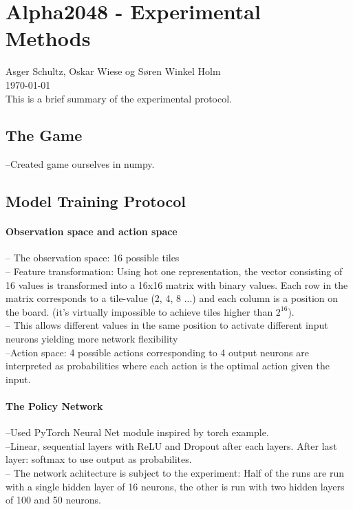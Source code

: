 \documentclass[12pt, fleqn]{article}
\date{\today}
\begin{document}
	
\pagestyle{empty}

\section*{Alpha2048 - Experimental Methods}
Asger Schultz, Oskar Wiese og Søren Winkel Holm\\
\today\\
This is a brief summary of the experimental protocol.
\subsection{The Game}
--Created game ourselves in numpy.
\subsection{Model Training Protocol}

\paragraph{Observation space and action space}
-- The observation space: 16 possible tiles
\\
-- Feature transformation: Using hot one representation, the vector consisting of 16 values is transformed into a 16x16 matrix with binary values. Each row in the matrix corresponds to a tile-value (2, 4, 8 ...) and each column is a position on the board. (it's virtually impossible to achieve tiles higher than $2^{16}$).\\ 
-- This allows different values in the same position to activate different input neurons yielding more network flexibility\\
--Action space: 4 possible actions corresponding to 4 output neurons are interpreted as probabilities where each action is the optimal action given the input. 
\paragraph*{The Policy Network}
--Used PyTorch Neural Net module inspired by torch example.\\
--Linear, sequential layers with ReLU and Dropout after each layers. After last layer: softmax to use output as probabilites.\\
-- The network achitecture is subject to the experiment: Half of the runs are run with a single hidden layer of 16 neurons, the other is run with two hidden layers of 100 and 50 neurons.
\end{document}
